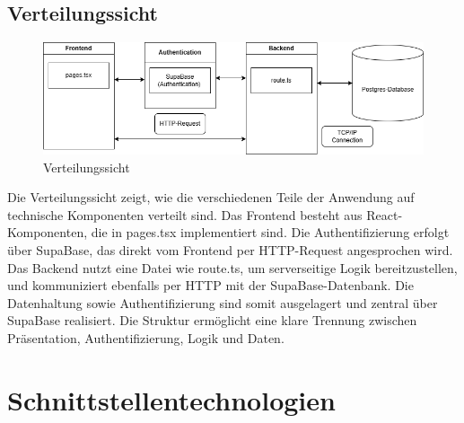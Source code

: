 \documentclass[a4paper,12pt]{article}
\begin{document}
\subsection{Verteilungssicht}
\begin{figure}[H]
  \centering
  \includegraphics[width=1\textwidth]{Abbildungen/verteilungssicht.png}
  \caption{Verteilungssicht}
  \label{fig:verteilungssicht}
\end{figure}
Die Verteilungssicht zeigt, wie die verschiedenen Teile der Anwendung auf technische Komponenten verteilt sind. Das Frontend besteht aus React-Komponenten, die in pages.tsx implementiert sind. Die Authentifizierung erfolgt über SupaBase, das direkt vom Frontend per HTTP-Request angesprochen wird. Das Backend nutzt eine Datei wie route.ts, um serverseitige Logik bereitzustellen, und kommuniziert ebenfalls per HTTP mit der SupaBase-Datenbank. Die Datenhaltung sowie Authentifizierung sind somit ausgelagert und zentral über SupaBase realisiert. Die Struktur ermöglicht eine klare Trennung zwischen Präsentation, Authentifizierung, Logik und Daten.

\newpage


\section{Schnittstellentechnologien}

\end{document}
